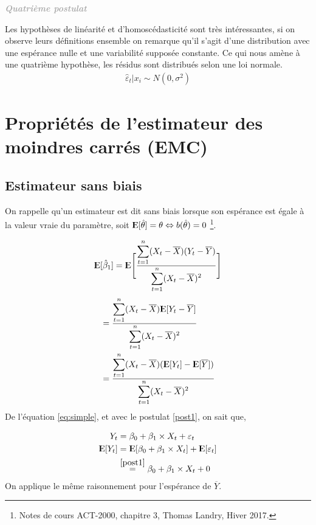 \documentclass[11pt,french]{report}
\newcommand{\E}{{\rm I\kern-.3em E}}
\newenvironment{moreInfo}[1]
	{\begin{mdframed}
	\textcolor{darkgray}{\huge \raisebox{-3.5pt}{\faInfo} 
	\hspace{0.5cm} \large\bfseries #1}\\[5pt]
	\normalsize
	\makebox[0.1\textwidth][l]{}	
	\begin{minipage}{10cm}}
	{	\end{minipage}
	\end{mdframed}}
\begin{document}
\bigskip
\begin{moreInfo}{\color{Gray}\emph{Quatrième postulat}
     \color{black}}
\label{post4}
	Les hypothèses de linéarité et d'homoscédasticité sont très intéressantes, si on observe leurs définitions ensemble on remarque qu'il s'agit d'une distribution avec une espérance nulle et une variabilité supposée constante. Ce qui nous amène à une quatrième hypothèse, les résidus sont distribués selon une loi normale.
	\begin{align*}
\hat{\varepsilon}_t|x_i \sim N(0, \sigma^2)
	\end{align*}
\end{moreInfo}
\bigskip

\section{Propriétés de l'estimateur des moindres carrés (EMC)}
\label{sec:EMC}

\subsection{Estimateur sans biais}
On rappelle qu'un estimateur est dit sans biais lorsque son espérance est égale à la valeur vraie du paramètre, soit $\E[\hat{\theta}] = \theta \Leftrightarrow b(\hat{\theta}) = 0$ \footnote{Notes de cours ACT-2000, chapitre 3, Thomas Landry, Hiver 2017.}.

\begin{align*}
\E[\hat{\beta}_1] &= \E \Bigg[ \frac{\displaystyle\sum_{t=1}^n(X_t- \overline{X})(Y_t - \overline{Y})}{\displaystyle\sum_{t=1}^n(X_t - \overline{X})^2} \Bigg] \\
\end{align*}
\begin{align*}
&= \frac{\displaystyle\sum_{t=1}^n(X_t- \overline{X})\E[Y_t - \overline{Y}]}{\displaystyle\sum_{t=1}^n(X_t - \overline{X})^2} \\
&= \frac{\displaystyle\sum_{t=1}^n(X_t- \overline{X})(\E[Y_t] - \E[\overline{Y}])}{\displaystyle\sum_{t=1}^n(X_t - \overline{X})^2} \\
\end{align*}
De l'équation \ref{eq:simple}, et avec le postulat \ref{post1}, on sait que,

\begin{align*}
Y_t &= \beta_0 + \beta_1\times X_t + \varepsilon_t \\
\E[Y_t] &= \E[\beta_0 + \beta_1\times X_t] + \E[\varepsilon_t] \\
&\overset{\ref{post1}}{=} \beta_0 + \beta_1\times X_t + 0 \\
\end{align*}
On applique le même raisonnement pour l'espérance de $\overline{Y}$. 
\end{document}
